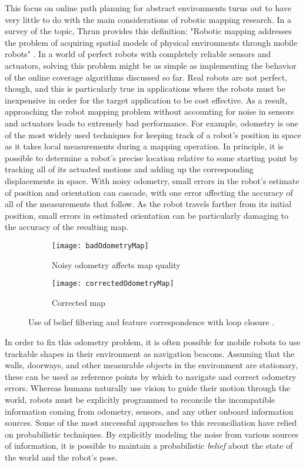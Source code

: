 This focus on online path planning for abstract environments turns out to have very little to do with the main considerations of robotic mapping research. In a survey of the topic, Thrun provides this definition: "Robotic mapping addresses the problem of acquiring spatial models of physical environments through mobile robots" \cite{Thrun}. In a world of perfect robots with completely reliable sensors and actuators, solving this problem might be as simple as implementing the behavior of the online coverage algorithms discussed so far. Real robots are not perfect, though, and this is particularly true in applications where the robots must be inexpensive in order for the target application to be cost effective. As a result, approaching the robot mapping problem without accounting for noise in sensors and actuators leads to extremely bad performance. For example, odometry is one of the most widely used techniques for keeping track of a robot's position in space as it takes local measurements during a mapping operation. In principle, it is possible to determine a robot's precise location relative to some starting point by tracking all of its actuated motions and adding up the corresponding displacements in space. With noisy odometry, small errors in the robot's estimate of position and orientation can cascade, with one error affecting the accuracy of all of the measurements that follow. As the robot travels farther from its initial position, small errors in estimated orientation can be particularly damaging to the accuracy of the resulting map.

\begin{figure}[H]
\begin{subfigure}{.5\textwidth}
  \centering
  \texttt{[image: badOdometryMap]}
  \caption{Noisy odometry affects map quality}
\end{subfigure}
\begin{subfigure}{.5\textwidth}
  \centering
  \texttt{[image: correctedOdometryMap]}
  \caption{Corrected map}
\end{subfigure}
\caption[Odometry Errors and Corrected Map]{Use of belief filtering and feature correspondence with loop closure \cite{Thrun}.}
\end{figure}

In order to fix this odometry problem, it is often possible for mobile robots to use trackable shapes in their environment as navigation beacons. Assuming that the walls, doorways, and other measurable objects in the environment are stationary, these can be used as reference points by which to navigate and correct odometry errors. Whereas humans naturally use vision to guide their motion through the world, robots must be explicitly programmed to reconcile the incompatible information coming from odometry, sensors, and any other onboard information sources. Some of the most successful approaches to this reconciliation have relied on probabilistic techniques. By explicitly modeling the noise from various sources of information, it is possible to maintain a probabilistic \textit{belief} about the state of the world and the robot's pose.

